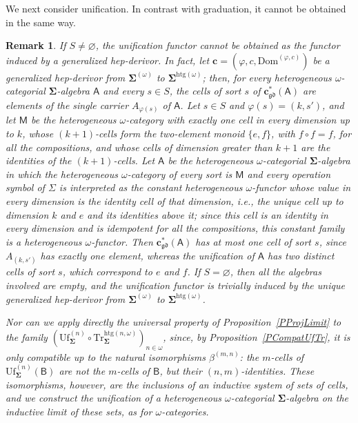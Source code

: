 \documentclass[a4paper, reqno]{amsbook}
\newcommand{\sig}[1]{\mathbf{#1}}             %
\newcommand{\calg}[1]{\boldsymbol{\mathsf{#1}}} %
\newcommand{\Dom}{\mathrm{Dom}}
\newcommand{\gd}{\mathfrak{gd}}              %
\newcommand{\htg}{\mathrm{htg}}                %
\newcommand{\Uf}{\mathrm{Uf}}
\newcommand{\Tr}{\mathrm{Tr}}
\theoremstyle{plain}
\newtheorem{remark}[theorem]{Remark}
\theoremstyle{definition}
\begin{document}
We next consider unification.
In contrast with graduation, it cannot be obtained in the same way.

\begin{remark}\label{RUfNotDerivorOmega}
If $S\neq\varnothing$, the unification functor cannot be obtained as the functor induced by a generalized hep-derivor.
In fact, let $\mathbf{c}=(\varphi,c,\Dom^{(\varphi,c)})$ be a generalized hep-derivor from $\sig{\Sigma}^{(\omega)}$ to $\sig{\Sigma}^{\htg(\omega)}$; then, for every heterogeneous $\omega$-categorial $\sig{\Sigma}$-algebra $\calg{A}$ and every $s\in S$, the cells of sort $s$ of $\mathbf{c}^{\ast}_{\gd}(\calg{A})$ are elements of the single carrier $A_{\varphi(s)}$ of $\calg{A}$.
Let $s\in S$ and $\varphi(s)=(k,s')$, and let $\mathsf{M}$ be the heterogeneous $\omega$-category with exactly one cell in every dimension up to $k$, whose $(k+1)$-cells form the two-element monoid $\{e,f\}$, with $f\circ f=f$, for all the compositions, and whose cells of dimension greater than $k+1$ are the identities of the $(k+1)$-cells.
Let $\calg{A}$ be the heterogeneous $\omega$-categorial $\sig{\Sigma}$-algebra in which the heterogeneous $\omega$-category of every sort is $\mathsf{M}$ and every operation symbol of $\Sigma$ is interpreted as the constant heterogeneous $\omega$-functor whose value in every dimension is the identity cell of that dimension, i.e., the unique cell up to dimension $k$ and $e$ and its identities above it; since this cell is an identity in every dimension and is idempotent for all the compositions, this constant family is a heterogeneous $\omega$-functor.
Then $\mathbf{c}^{\ast}_{\gd}(\calg{A})$ has at most one cell of sort $s$, since $A_{(k,s')}$ has exactly one element, whereas the unification of $\calg{A}$ has two distinct cells of sort $s$, which correspond to $e$ and $f$.
If $S=\varnothing$, then all the algebras involved are empty, and the unification functor is trivially induced by the unique generalized hep-derivor from $\sig{\Sigma}^{(\omega)}$ to $\sig{\Sigma}^{\htg(\omega)}$.

Nor can we apply directly the universal property of Proposition~\ref{PProjLimit} to the family $(\Uf^{(n)}_{\sig{\Sigma}}\circ \Tr^{\htg(n,\omega)}_{\sig{\Sigma}})_{n\in\omega}$, since, by Proposition~\ref{PCompatUfTr}, it is only compatible up to the natural isomorphisms $\beta^{(m,n)}$: the $m$-cells of $\Uf^{(n)}_{\sig{\Sigma}}(\calg{B})$ are not the $m$-cells of $\calg{B}$, but their $(n,m)$-identities.
These isomorphisms, however, are the inclusions of an inductive system of sets of cells, and we construct the unification of a heterogeneous $\omega$-categorial $\sig{\Sigma}$-algebra on the inductive limit of these sets, as for $\omega$-categories.
\end{remark}
\end{document}
